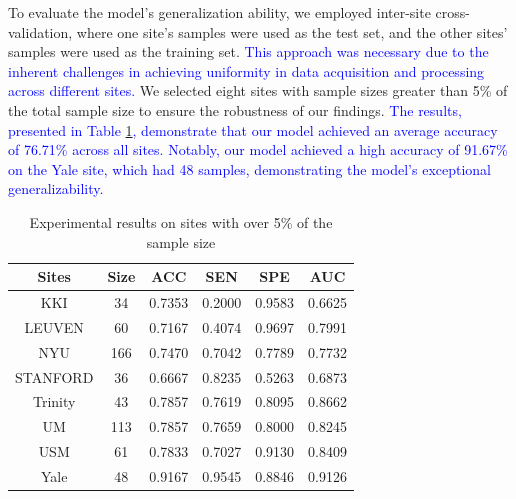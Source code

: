 \documentclass[a4paper]{cas-dc}
\begin{document}
To evaluate the model's generalization ability, we employed inter-site cross-validation, where one site's samples were used as the test set, and the other sites' samples were used as the training set. \textcolor{blue}{This approach was necessary due to the inherent challenges in achieving uniformity in data acquisition and processing across different sites.}  We selected eight sites with sample sizes greater than 5\% of the total sample size to ensure the robustness of our findings. \textcolor{blue}{The results, presented in Table \ref{Table5}, demonstrate that our model achieved an average accuracy of 76.71\% across all sites. Notably, our model achieved a high accuracy of 91.67\% on the Yale site, which had 48 samples, demonstrating the model's exceptional generalizability.}
\begin{table}[]
	\caption{Experimental results on sites with over 5\% of the sample size}\label{Table5}
	\begin{tabular*}{\tblwidth}{@{}cccccc@{}}
		\toprule
		\textbf{Sites}&\textbf{Size}& \textbf{ACC} & \textbf{SEN} & \textbf{SPE} & \textbf{AUC} \\ %
		\midrule
		KKI            & 34                   & 0.7353            & 0.2000               & 0.9583               & 0.6625       \\
		LEUVEN         & 60                   & 0.7167            & 0.4074               & 0.9697               & 0.7991       \\
		NYU            & 166                  & 0.7470            & 0.7042               & 0.7789               & 0.7732       \\
		STANFORD       & 36                   & 0.6667            & 0.8235               & 0.5263               & 0.6873       \\
		Trinity        & 43                   & 0.7857            & 0.7619               & 0.8095               & 0.8662       \\
		UM             & 113                  & 0.7857            & 0.7659               & 0.8000               & 0.8245       \\
		USM            & 61                   & 0.7833            & 0.7027               & 0.9130               & 0.8409       \\
		Yale           & 48                   & 0.9167            & 0.9545               & 0.8846               & 0.9126 \\
		\bottomrule
	\end{tabular*}
\end{table}
\end{document}
